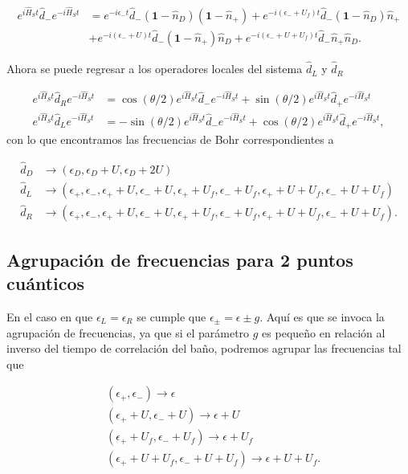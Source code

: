 \begin{appendixs}
\begin{align*}
    e^{i \hat{H}_{S}t}\hat{d}_{-}e^{-i\hat{H}_{S}t} & = e^{-i\epsilon_{-}t}\hat{d}_{-}(\textbf{1}-\hat{n}_{D})(\textbf{1}-\hat{n}_{+}) + e^{-i(\epsilon_{-}+U_{f})t} \hat{d}_{-}(\textbf{1}-\hat{n}_{D})\hat{n}_{+} \\
    & + e^{-i(\epsilon_{-}+U)t}\hat{d}_{-}(\textbf{1}-\hat{n}_{+})\hat{n}_{D} + e^{-i(\epsilon_{-}+U+U_{f})t}\hat{d}_{-}\hat{n}_{+}\hat{n}_{D}.
\end{align*}

Ahora se puede regresar a los operadores locales del sistema $\hat{d}_{L}$ y $\hat{d}_{R}$

\begin{align*}
    e^{i\hat{H}_{S}t}\hat{d}_{R}e^{-i\hat{H}_{S}t} & = \cos(\theta/2)e^{i\hat{H}_{S}t}\hat{d}_{-}e^{-i\hat{H}_{S}t} + \sin(\theta/2)e^{i\hat{H}_{S}t}\hat{d}_{+}e^{-i\hat{H}_{S}t}  \\
    e^{i\hat{H}_{S}t}\hat{d}_{L}e^{-i\hat{H}_{S}t} & = -\sin(\theta/2)e^{i\hat{H}_{S}t}\hat{d}_{-}e^{-i\hat{H}_{S}t} + \cos(\theta/2)e^{i\hat{H}_{S}t}\hat{d}_{+}e^{-i\hat{H}_{S}t},
\end{align*}
con lo que encontramos las frecuencias de Bohr correspondientes a

\begin{align*}
    \hat{d}_{D} & \to (\epsilon_{D}, \epsilon_{D}+U,\epsilon_{D}+2U) \\
    \hat{d}_{L} & \to (\epsilon_{+},\epsilon_{-},\epsilon_{+}+U,\epsilon_{-}+U,\epsilon_{+}+U_{f},\epsilon_{-}+U_{f},\epsilon_{+}+U+U_{f},\epsilon_{-}+U+U_{f}) \\
    \hat{d}_{R} & \to (\epsilon_{+},\epsilon_{-},\epsilon_{+}+U,\epsilon_{-}+U,\epsilon_{+}+U_{f},\epsilon_{-}+U_{f},\epsilon_{+}+U+U_{f},\epsilon_{-}+U+U_{f}).
\end{align*}

\label{apendix5jumpop}

\subsection{Agrupación de frecuencias para 2 puntos cuánticos}
En el caso en que $\epsilon_{L} = \epsilon_{R}$ se cumple que $\epsilon_{\pm} = \epsilon \pm g$. Aquí es que se invoca la agrupación de frecuencias, ya que si el parámetro $g$ es pequeño en relación al inverso del tiempo de correlación del baño, podremos agrupar las frecuencias tal que

\begin{align*}
    &(\epsilon_{+},\epsilon_{-})  \to \epsilon \\
    &(\epsilon_{+}+U,\epsilon_{-}+U)  \to \epsilon+U \\
    &(\epsilon_{+}+U_{f},\epsilon_{-}+U_{f})  \to \epsilon+U_{f} \\
    &(\epsilon_{+}+U+U_{f},\epsilon_{-}+U+U_{f})  \to \epsilon+U+U_{f}.
\end{align*}


\end{appendixs}
